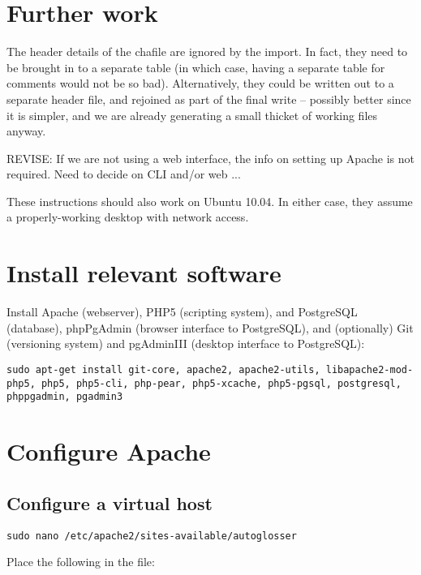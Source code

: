 \documentclass[a4paper,10pt]{article}
\begin{document}
{\section{Further work}
\label{sec:further}

The header details of the chafile are ignored by the import.  In fact, they need to be brought in to a separate table (in which case, having a separate table for comments would not be so bad).  Alternatively, they could be written out to a separate header file, and rejoined as part of the final write -- possibly better since it is simpler, and we are already generating a small thicket of working files anyway.





\newpage
\appendix
\renewcommand{\appendixpagename}{Appendix:\\
Configuring Ubuntu 9.10}
\appendixpage

REVISE: If we are not using a web interface, the info on setting up Apache is not required.  Need to decide on CLI and/or web ...

These instructions should also work on Ubuntu 10.04. In either case, they assume a properly-working desktop with network access.

\section{Install relevant software}

Install Apache (webserver), PHP5 (scripting system), and PostgreSQL (database), phpPgAdmin (browser interface to PostgreSQL), and (optionally) Git (versioning system) and pgAdminIII (desktop interface to PostgreSQL):

\texttt{sudo apt-get install git-core, apache2, apache2-utils, libapache2-mod-php5, php5, php5-cli, php-pear, php5-xcache, php5-pgsql, postgresql, phppgadmin, pgadmin3}

\section{Configure Apache}

\subsection{Configure a virtual host}

\texttt{sudo nano /etc/apache2/sites-available/autoglosser}

Place the following in the file:

}
\end{document}
